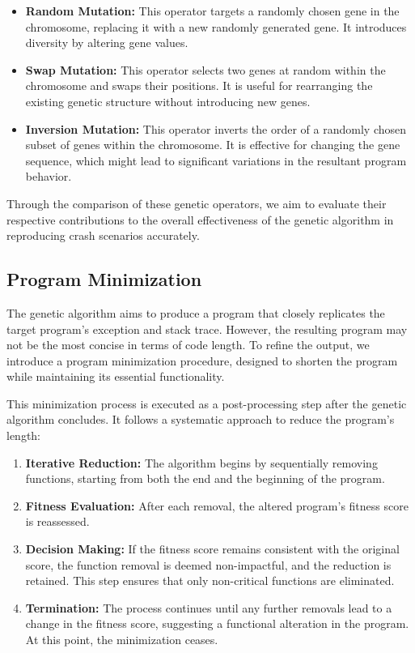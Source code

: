         \begin{itemize}
            \item \textbf{Random Mutation:} This operator targets a randomly chosen gene in the chromosome, replacing it
                with a new randomly generated gene. It introduces diversity by altering gene values.
            \item \textbf{Swap Mutation:} This operator selects two genes at random within the chromosome and swaps
                their positions. It is useful for rearranging the existing genetic structure without introducing new genes.
            \item \textbf{Inversion Mutation:} This operator inverts the order of a randomly chosen subset of genes
                within the chromosome. It is effective for changing the gene sequence, which might lead to significant
                variations in the resultant program behavior.
        \end{itemize}
        
        Through the comparison of these genetic operators, we aim to evaluate their respective contributions to the 
        overall effectiveness of the genetic algorithm in reproducing crash scenarios accurately.
    
    \subsection{Program Minimization}
        The genetic algorithm aims to produce a program that closely replicates the target program's exception and stack 
        trace. However, the resulting program may not be the most concise in terms of code length. To refine the output, 
        we introduce a program minimization procedure, designed to shorten the program while maintaining its essential 
        functionality.
    
        This minimization process is executed as a post-processing step after the genetic algorithm concludes. It 
        follows a systematic approach to reduce the program's length:
    
        \begin{enumerate}
            \item \textbf{Iterative Reduction:} The algorithm begins by sequentially removing functions, starting from 
                both the end and the beginning of the program.
            \item \textbf{Fitness Evaluation:} After each removal, the altered program's fitness score is reassessed.
            \item \textbf{Decision Making:} If the fitness score remains consistent with the original score, the 
                function removal is deemed non-impactful, and the reduction is retained. This step ensures that only 
                non-critical functions are eliminated.
            \item \textbf{Termination:} The process continues until any further removals lead to a change in the fitness 
                score, suggesting a functional alteration in the program. At this point, the minimization ceases.
        \end{enumerate}
    

